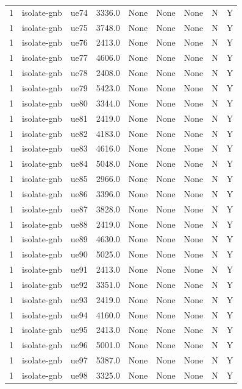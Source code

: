\begin{table}[ht]
\begin{tabular}{|c|c|c|c|c|c|c|c|c|}
1 & isolate-gnb & ue74 & 3336.0 & None & None & None & N & Y \\
1 & isolate-gnb & ue75 & 3748.0 & None & None & None & N & Y \\
1 & isolate-gnb & ue76 & 2413.0 & None & None & None & N & Y \\
1 & isolate-gnb & ue77 & 4606.0 & None & None & None & N & Y \\
1 & isolate-gnb & ue78 & 2408.0 & None & None & None & N & Y \\
1 & isolate-gnb & ue79 & 5423.0 & None & None & None & N & Y \\
1 & isolate-gnb & ue80 & 3344.0 & None & None & None & N & Y \\
1 & isolate-gnb & ue81 & 2419.0 & None & None & None & N & Y \\
1 & isolate-gnb & ue82 & 4183.0 & None & None & None & N & Y \\
1 & isolate-gnb & ue83 & 4616.0 & None & None & None & N & Y \\
1 & isolate-gnb & ue84 & 5048.0 & None & None & None & N & Y \\
1 & isolate-gnb & ue85 & 2966.0 & None & None & None & N & Y \\
1 & isolate-gnb & ue86 & 3396.0 & None & None & None & N & Y \\
1 & isolate-gnb & ue87 & 3828.0 & None & None & None & N & Y \\
1 & isolate-gnb & ue88 & 2419.0 & None & None & None & N & Y \\
1 & isolate-gnb & ue89 & 4630.0 & None & None & None & N & Y \\
1 & isolate-gnb & ue90 & 5025.0 & None & None & None & N & Y \\
1 & isolate-gnb & ue91 & 2413.0 & None & None & None & N & Y \\
1 & isolate-gnb & ue92 & 3351.0 & None & None & None & N & Y \\
1 & isolate-gnb & ue93 & 2419.0 & None & None & None & N & Y \\
1 & isolate-gnb & ue94 & 4160.0 & None & None & None & N & Y \\
1 & isolate-gnb & ue95 & 2413.0 & None & None & None & N & Y \\
1 & isolate-gnb & ue96 & 5001.0 & None & None & None & N & Y \\
1 & isolate-gnb & ue97 & 5387.0 & None & None & None & N & Y \\
1 & isolate-gnb & ue98 & 3325.0 & None & None & None & N & Y \\

\end{tabular}
\end{table}
